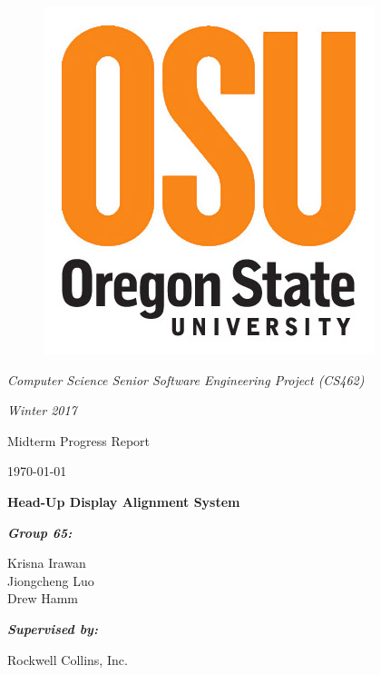 \documentclass[letterpaper,10pt,onecolumn]{IEEEtran}
\def\name{Krisna Irawan\\ Jiongcheng Luo\\ Drew Hamm}
\def\doc{Midterm Progress Report}
\begin{document}
\begin{titlepage}
	\centering
	\begin{figure}
	      	\includegraphics[scale=0.25]{img/osulogo}
	\end{figure}
	{\Large\itshape Computer Science Senior Software Engineering Project (CS462)\par}
	{\Large\itshape Winter 2017\par}
	\vspace{1cm}
	\scshape{
		{\huge\doc\par}
		{\large \today\par}
		\vspace{1cm}
		{\Huge\bfseries Head-Up Display Alignment System\par}
	}
	\vspace{2cm}
	{\large\itshape\bfseries Group 65:\par}
	{\large \name\par}
	\vspace{1cm}
	{\large\itshape\bfseries Supervised by:\par}
	{\large Rockwell Collins, Inc.\par}
	\vspace{5cm}


	\begin{abstract}
	This report keeps track of our project progress for the first half of the winter term 2017. The document consists of three main sections that each section summarizes the progresses that made by each individual member. The report mainly introduces our current stage of the project, remaining work, the problems we met and their solutions, also some pieces of coding and experimental design we have been working on. 
	\end{abstract}
	\vfill
\end{titlepage}
\end{document}

